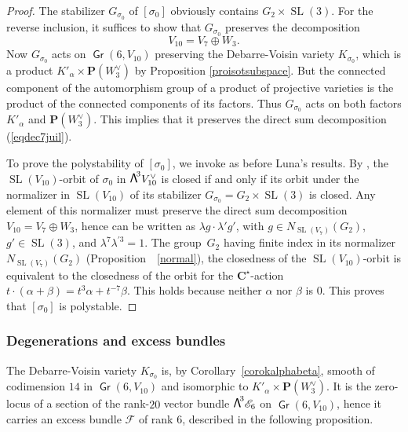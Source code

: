 \documentclass[JEP,XML,SOM,Unicode, NoEqCountersInSection,NoFloatCountersInSection]{cedram}
\let\mathcal\mathscr
\theoremstyle{definition}
\renewcommand\C{{\mathbf C}}\let\CC\C
\renewcommand\P{{\mathbf P}}\let\PP\P
\newcommand\cE{\mathcal{E}}
\newcommand\cF{\mathcal{F}}
\DeclareMathOperator{\Gr}{\mathsf{Gr}}
\DeclareMathOperator{\SL}{SL}
\newcommand\bw[1]{{\hbox{\large$\mathsf{\Lambda}$}^{\!#1}}}
\begin{document}
\begin{proof} The stabilizer $G_{\sigma_0}$ of $[\sigma_0]$ obviously contains $G_2\times \SL(3)$. For the reverse inclusion, it suffices to show that $G_{\sigma_0}$ preserves the decomposition
\begin{equation}
\label{eqdec7juil}
V_{10}=V_7\oplus W_3.
\end{equation}
Now $G_{\sigma_0}$ acts on $\Gr(6,V_{10})$ preserving
the Debarre-Voisin variety $K_{\sigma_0}$, which is a product \mbox{$K'_\alpha\times \P(W_3^\vee)$} by Proposition
\ref{proisotsubspace}. But the connected component of the auto\-morphism group of a product
of projective varieties is the product of the connected components of its factors. Thus
$G_{\sigma_0}$ acts on both factors $K'_\alpha$ and $\P(W_3^\vee)$. This implies that it preserves the direct sum decomposition
(\ref{eqdec7juil}).

To prove the polystability of $[\sigma_0]$, we invoke as before Luna's results. By \cite[Cor.\,1]{luna}, the $\SL(V_{10})$-orbit of $\sigma_0$ in $\bw3V_{10}^\vee$ is closed if and only if its orbit under the normalizer in $\SL(V_{10})$ of its stabilizer $G_{\sigma_0}=G_2\times \SL(3)$ is closed. Any element of this normalizer must preserve the direct sum decomposition $V_{10}=V_7\oplus W_3$, hence can be written
as $ \lambda g \cdot \lambda' g' $, with $g \in N_{\SL(V_7)}(G_2)$, $g'\in \SL(3)$, and $\lambda^7\lambda^{\prime 3}=1$.
The group~$G_2$ having finite index in its normalizer $N_{\SL(V_7)}(G_2)$ (Proposition~~\ref{normal}), the closedness of
the $\SL(V_{10})$-orbit
is equivalent to the closedness of
the orbit for the $\C^\star$-action $t\cdot (\alpha+\beta)=t^3\alpha+t^{-7}\beta$. This holds because neither $\alpha$ nor $\beta$ is $0$. This proves that $[\sigma_0]$ is polystable.
\end{proof}

\subsubsection{Degenerations and excess bundles}

The Debarre-Voisin variety $K_{\sigma_0}$ is, by Corollary~\ref{corokalphabeta}, smooth of codimension $14$
in $\Gr(6,V_{10})$ and isomorphic to $K'_\alpha\times \P(W_3^\vee)$. It is the zero-locus of a section
of the rank-$20$ vector bundle $\bw3\cE_6$ on $\Gr(6,V_{10})$, hence it carries
an excess bundle $\cF$ of rank $6$, described in the
following proposition.
\end{document}
